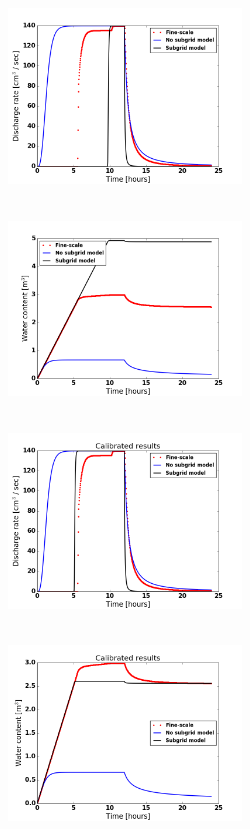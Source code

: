 \documentclass[review,11pt]{elsarticle}
\begin{document}
\begin{figure}
\centering
\includegraphics[width=6.2cm, height=5.5cm]{./figures/POLYGON44/POLYGON44discharge.png}
\includegraphics[width=6.2cm, height=5.5cm]{./figures/POLYGON44/POLYGON44watercontent.png}\\
\includegraphics[width=6.2cm, height=5.5cm]{./figures/POLYGON44/POLYGON44dischargeCalibDD.png}
\includegraphics[width=6.2cm, height=5.5cm]{./figures/POLYGON44/POLYGON44watercontentCalibDD.png} \\

\end{figure}
\end{document}
